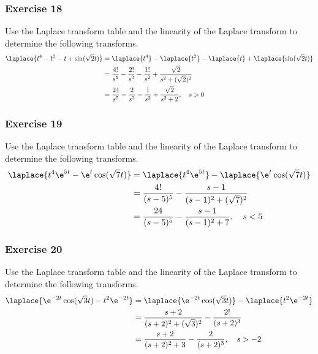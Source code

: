 \documentclass{math}
\begin{document}
\subsubsection*{Exercise 18}
Use the Laplace transform table and the linearity of the Laplace transform to
determine the following transforms.
\begin{align*}
  \laplace{t^4-t^2-t+\sin(\sqrt{2}t)} &= \laplace{t^4}-\laplace{t^2}-
    \laplace{t}+\laplace{\sin(\sqrt{2}t)} \\
  &= \frac{4!}{s^5}-\frac{2!}{s^3}-\frac{1!}{s^2}+
    \frac{\sqrt{2}}{s^2+(\sqrt{2})^2} \\
  &= \frac{24}{s^5}-\frac{2}{s^3}-\frac{1}{s^2}+\frac{\sqrt{2}}{s^2+2},
    \quad s>0
\end{align*}

\subsubsection*{Exercise 19}
Use the Laplace transform table and the linearity of the Laplace transform to
determine the following transforms.
\begin{align*}
  \laplace{t^4\e^{5t}-\e^t\cos(\sqrt{7}t)} &= \laplace{t^4\e^{5t}}-
    \laplace{\e^t\cos(\sqrt{7}t)} \\
  &= \frac{4!}{(s-5)^5}-\frac{s-1}{(s-1)^2+(\sqrt{7})^2} \\
  &= \frac{24}{(s-5)^5}-\frac{s-1}{(s-1)^2+7}, \quad s<5
\end{align*}

\subsubsection*{Exercise 20}
Use the Laplace transform table and the linearity of the Laplace transform to
determine the following transforms.
\begin{align*}
  \laplace{\e^{-2t}\cos(\sqrt{3}t)-t^2\e^{-2t}} &=
    \laplace{\e^{-2t}\cos(\sqrt{3}t)}-\laplace{t^2\e^{-2t}} \\
  &= \frac{s+2}{(s+2)^2+(\sqrt{3})^2}-\frac{2!}{(s+2)^3} \\
  &= \frac{s+2}{(s+2)^2+3}-\frac{2}{(s+2)^3}, \quad s>-2
\end{align*}
\end{document}
